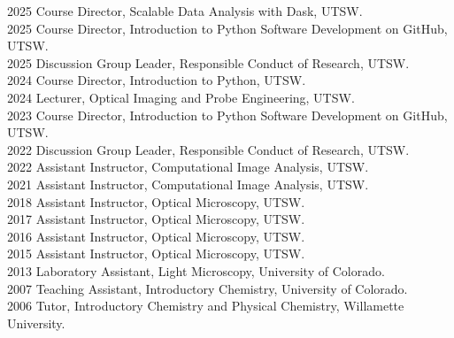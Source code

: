 2025 \hspace{58pt} Course Director, Scalable Data Analysis with Dask, UTSW. \\
2025 \hspace{58pt} Course Director, Introduction to Python Software Development on GitHub, UTSW. \\
2025 \hspace{58pt} Discussion Group Leader, Responsible Conduct of Research, UTSW. \\ 
2024 \hspace{58pt} Course Director, Introduction to Python, UTSW. \\
2024 \hspace{58pt} Lecturer, Optical Imaging and Probe Engineering, UTSW. \\
2023 \hspace{58pt} Course Director, Introduction to Python Software Development on GitHub, UTSW. \\
2022 \hspace{58pt} Discussion Group Leader, Responsible Conduct of Research, UTSW. \\ 
2022 \hspace{58pt} Assistant Instructor, Computational Image Analysis, UTSW. \\
2021 \hspace{58pt} Assistant Instructor, Computational Image Analysis, UTSW. \\
2018 \hspace{58pt} Assistant Instructor, Optical Microscopy, UTSW. \\
2017 \hspace{58pt} Assistant Instructor, Optical Microscopy, UTSW. \\
2016 \hspace{58pt} Assistant Instructor, Optical Microscopy, UTSW. \\
2015 \hspace{58pt} Assistant Instructor, Optical Microscopy, UTSW. \\
2013 \hspace{58pt} Laboratory Assistant, Light Microscopy, University of Colorado. \\
2007 \hspace{58pt} Teaching Assistant, Introductory Chemistry, University of Colorado.  \\
2006 \hspace{58pt} Tutor, Introductory Chemistry and Physical Chemistry, Willamette University. \\
\\ 
